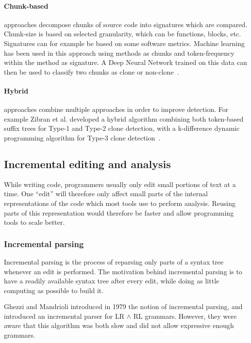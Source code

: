 \paragraph{Chunk-based} approaches decompose chunks of source code into signatures which are
compared. Chunk-size is based on selected granularity, which can be functions, blocks,
etc. Signatures can for example be based on some software metrics. Machine learning has
been used in this approach using methods as chunks and token-frequency within the method
as signature. A Deep Neural Network trained on this data can then be used to classify two
chunks as clone or non-clone~\cite{CCLearner}.

\paragraph{Hybrid} approaches combine multiple approaches in order to improve detection.
For example Zibran et al. developed a hybrid algorithm combining both token-based suffix
trees for Type-1 and Type-2 clone detection, with a k-difference dynamic programming
algorithm for Type-3 clone detection~\cite{Zibran_real_time_search}.

\subsection{Incremental editing and analysis}

While writing code, programmers usually only edit small portions of text at a time. One
``edit'' will therefore only affect small parts of the internal representations of the
code which most tools use to perform analysis. Reusing parts of this representation would
therefore be faster and allow programming tools to scale better.

\subsubsection{Incremental parsing}

Incremental parsing is the process of reparsing only parts of a syntax tree whenever an
edit is performed. The motivation behind incremental parsing is to have a readily
available syntax tree after every edit, while doing as little computing as possible to
build it.

Ghezzi and Mandrioli introduced in 1979 the notion of incremental parsing, and
introduced an incremental parser for LR $\land$ RL grammars. However, they were aware that
this algorithm was both slow and did not allow expressive enough
grammars.~\cite{IncrementalParsing}

